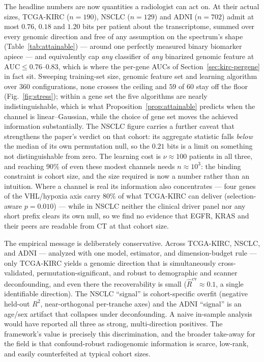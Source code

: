 \documentclass{article}
\begin{document}
The headline numbers are now quantities a radiologist can act on. At their
actual sizes, TCGA-KIRC ($n=190$), NSCLC ($n=129$) and ADNI ($n=702$) admit at
most $0.76$, $0.18$ and $1.20$ bits per patient about the transcriptome, summed
over every genomic direction and free of any assumption on the spectrum's shape
(Table~\ref{tab:attainable}) --- around one perfectly measured binary biomarker
apiece --- and equivalently cap \emph{any}
classifier of \emph{any} binarized genomic feature at
$\mathrm{AUC}\le0.76$--$0.83$, which is where the per-gene AUCs of
Section~\ref{sec:kirc-pergene} in fact sit. Sweeping training-set size, genomic feature
set and learning algorithm over $360$ configurations, none crosses the ceiling
and $59$ of $60$ stay off the floor (Fig.~\ref{fig:stress}); within a gene set
the five algorithms are nearly indistinguishable, which is what
Proposition~\ref{prop:attainable} predicts when the channel is
linear--Gaussian, while the choice of gene set moves the achieved information
substantially. The NSCLC figure carries a further
caveat that strengthens the paper's verdict on that cohort: its aggregate
statistic falls \emph{below} the median of its own permutation null, so the
$0.21$ bits is a limit on something not distinguishable from zero. The learning cost is
$\nu\approx100$ patients in all three, and reaching $90\%$ of even these modest
channels needs $n\approx10^3$: the binding constraint is cohort size, and the
size required is now a number rather than an intuition. Where a channel is real
its information also concentrates --- four genes of the VHL/hypoxia axis carry
$80\%$ of what TCGA-KIRC can deliver (selection-aware $p=0.010$) --- while in
NSCLC neither the clinical driver panel nor any short prefix clears its own
null, so we find no evidence that EGFR, KRAS and their peers are readable from
CT at that cohort size.

The empirical message is deliberately conservative. Across TCGA-KIRC, NSCLC, and
ADNI --- analyzed with one model, estimator, and dimension-budget rule --- only
TCGA-KIRC yields a genomic direction that is simultaneously cross-validated,
permutation-significant, and robust to demographic and scanner deconfounding, and
even there the recoverability is small ($\hat R^{\mathrm{cv}}\approx 0.1$, a
single identifiable direction). The NSCLC ``signal'' is cohort-specific overfit
(negative held-out $R^2$, near-orthogonal per-tranche axes) and the ADNI
``signal'' is an age/sex artifact that collapses under deconfounding. A naive
in-sample analysis would have reported all three as strong, multi-direction
positives. The framework's value is precisely this discrimination, and the
broader take-away for the field is that confound-robust radiogenomic information
is scarce, low-rank, and easily counterfeited at typical cohort sizes.
\end{document}
